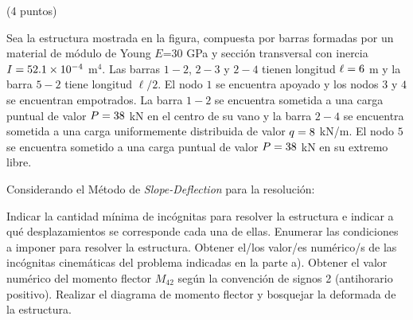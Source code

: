 %
\ejercicio (4 puntos)

Sea la estructura mostrada en la figura, compuesta por barras formadas por un material de módulo de Young $E$=30 GPa y sección transversal con inercia $I=52.1 \times 10^{-4}$ m$^4$. %
%
Las barras $1-2$, $2-3$ y $2-4$ tienen longitud $\ell = 6$ m y la barra $5-2$ tiene longitud $\ell/2$. El nodo $1$ se encuentra apoyado y los nodos $3$ y $4$ se encuentran empotrados. La barra $1-2$ se encuentra sometida a una carga puntual de valor $P=38$ kN en el centro de su vano y la barra $2-4$ se encuentra sometida a una carga uniformemente distribuida de valor $q=8$ kN/m. El nodo $5$ se encuentra sometido a una carga puntual de valor $P=38$ kN en su extremo libre. 
  
\begin{figure}[H]
	\begin{center}
		 \def\svgwidth{0.7\textwidth}
		 
	\end{center}
\end{figure}


Considerando el Método de \textit{Slope-Deflection} para la resolución:

\parte Indicar la cantidad mínima de incógnitas para resolver la estructura e indicar a qué  desplazamientos se corresponde cada una de ellas.
%
\parte Enumerar las condiciones a imponer para resolver la estructura.
%
\parte Obtener el/los valor/es numérico/s de las incógnitas cinemáticas del problema indicadas en la parte a).
%
\parte Obtener el valor numérico del momento flector $M_{42}$ según la convención de signos 2 (antihorario positivo). %
%
\parte Realizar el diagrama de momento flector y bosquejar la deformada de la estructura.
 